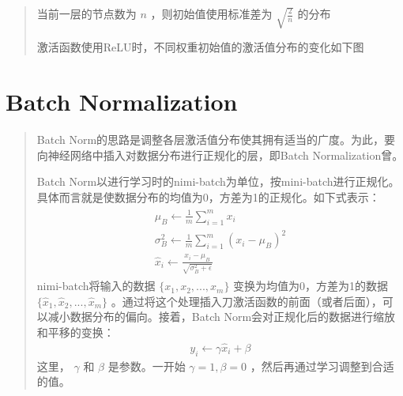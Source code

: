 \documentclass[letterpaper,10pt,english]{sphinxmanual}
\begin{document}
\begin{quote}

当前一层的节点数为
\(n\)
，则初始值使用标准差为
\(\sqrt{\frac{2}{n}}\)
的分布

激活函数使用ReLU时，不同权重初始值的激活值分布的变化如下图


\end{quote}


\section{Batch Normalization}
\label{\detokenize{_u4e0e_u5b66_u4e60_u76f8_u5173_u7684_u6280_u5de7:batch-normalization}}\begin{quote}

Batch Norm的思路是调整各层激活值分布使其拥有适当的广度。为此，要向神经网络中插入对数据分布进行正规化的层，即Batch Normalization曾。


Batch Norm以进行学习时的nimi-batch为单位，按mini-batch进行正规化。具体而言就是使数据分布的均值为0，方差为1的正规化。如下式表示：
\begin{equation*}
\begin{split}\begin{align}
    \mu_B \leftarrow \frac{1}{m}\sum_{i=1}^{m}x_i\\
\sigma^{2}_B \leftarrow \frac{1}{m}\sum_{i=1}^m{(x_i - \mu_B)}^{2}\\
    \hat{x}_i \leftarrow \frac{x_i - \mu_B}{\sqrt{\sigma^{2}_B + \epsilon}}
    \end{align}\end{split}
\end{equation*}
nimi-batch将输入的数据
\(\{x_1,x_2,...,x_m\}\)
变换为均值为0，方差为1的数据
\(\{\hat{x}_1,\hat{x}_2,...,\hat{x}_m\}\)
。通过将这个处理插入刀激活函数的前面（或者后面），可以减小数据分布的偏向。接着，Batch Norm会对正规化后的数据进行缩放和平移的变换：
\begin{equation*}
\begin{split}y_i \leftarrow \gamma\hat{x}_i + \beta\end{split}
\end{equation*}
这里，
\(\gamma\)
和
\(\beta\)
是参数。一开始
\(\gamma = 1, \beta = 0\)
，然后再通过学习调整到合适的值。
\end{quote}
\end{document}
